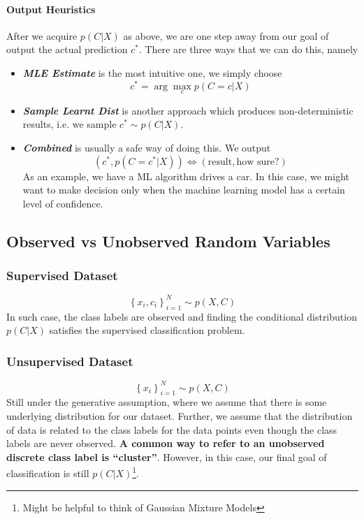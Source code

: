 \documentclass[11pt]{article}
\newcommand{\argmax}{\arg\max}
\begin{document}
\paragraph{Output Heuristics} After we acquire $p(C|X)$ as above, we are one step away from our goal of output the actual prediction $c^*$. There are three ways that we can do this, namely
\begin{itemize}
    \item \textit{\textbf{MLE Estimate}} is the most intuitive one, we simply choose
        \begin{equation}
            c^* = \argmax_c p(C = c|X)
        \end{equation}
    \item \textit{\textbf{Sample Learnt Dist}} is another approach which produces non-deterministic results, i.e. we sample $c^* \sim p(C|X)$.
    \item \textit{\textbf{Combined}} is usually a safe way of doing this. We output
        \begin{equation}
            (c^*, p(C=c^*|X)) \iff (\text{result}, \text{how sure?})
        \end{equation}
    As an example, we have a ML algorithm drives a car. In this case, we might want to make decision only when the machine learning model has a certain level of confidence. 
\end{itemize}

\subsection{Observed vs Unobserved Random Variables}
\subsubsection{Supervised Dataset}
\begin{equation}
    \left\{x_{i}, c_{i}\right\}_{i=1}^{N} \sim p(X, C)
\end{equation}
In such case, the class labels are observed and finding the conditional distribution $p(C|X)$ satisfies the supervised classification problem. 

\subsubsection{Unsupervised Dataset}
\begin{equation}
    \left\{x_{i}\right\}_{i=1}^{N} \sim p(X, C)
\end{equation}
Still under the generative assumption, where we assume that there is some underlying distribution for our dataset. Further, we assume that the distribution of data is related to the class labels for the data points even though the class labels are never observed. \textbf{A common way to refer to an unobserved discrete class label is ``cluster''}. However, in this case, our final goal of classification is still $p(C|X)$\footnote{Might be helpful to think of Gaussian Mixture Models}. 
\end{document}
